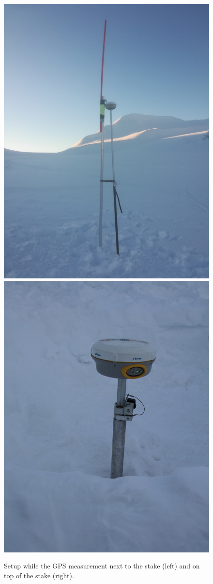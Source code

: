 \begin{figure}
\centering
\includegraphics[width=0.48\linewidth]{./figs/pictures/GPS_setup.jpg}
\includegraphics[width=0.485\linewidth]{./figs/pictures/setup_ontop.JPG}
\caption{Setup while the GPS measurement next to the stake (left) and on top of the stake (right).}
\label{GPS:fig:setup}
\end{figure}
